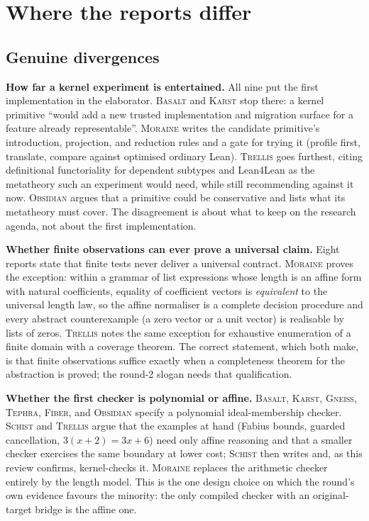 \documentclass[11pt,a4paper]{article}
\newcommand{\Bs}{\textsc{Basalt}}
\newcommand{\Fb}{\textsc{Fiber}}
\newcommand{\Gn}{\textsc{Gneiss}}
\newcommand{\Ks}{\textsc{Karst}}
\newcommand{\Mr}{\textsc{Moraine}}
\newcommand{\Ob}{\textsc{Obsidian}}
\newcommand{\Sc}{\textsc{Schist}}
\newcommand{\Tp}{\textsc{Tephra}}
\newcommand{\Tr}{\textsc{Trellis}}
\theoremstyle{definition}
\begin{document}
\section{Where the reports differ}\label{sec:divergence}

\subsection{Genuine divergences}
\textbf{How far a kernel experiment is entertained.} All nine put the first implementation in the elaborator. \Bs{} and \Ks{} stop there: a kernel primitive ``would add a new trusted implementation and migration surface for a feature already representable''. \Mr{} writes the candidate primitive's introduction, projection, and reduction rules and a gate for trying it (profile first, translate, compare against optimised ordinary Lean). \Tr{} goes furthest, citing definitional functoriality for dependent subtypes and Lean4Lean as the metatheory such an experiment would need, while still recommending against it now. \Ob{} argues that a primitive could be conservative and lists what its metatheory must cover. The disagreement is about what to keep on the research agenda, not about the first implementation.

\textbf{Whether finite observations can ever prove a universal claim.} Eight reports state that finite tests never deliver a universal contract. \Mr{} proves the exception: within a grammar of list expressions whose length is an affine form with natural coefficients, equality of coefficient vectors is \emph{equivalent} to the universal length law, so the affine normaliser is a complete decision procedure and every abstract counterexample (a zero vector or a unit vector) is realisable by lists of zeros. \Tr{} notes the same exception for exhaustive enumeration of a finite domain with a coverage theorem. The correct statement, which both make, is that finite observations suffice exactly when a completeness theorem for the abstraction is proved; the round-2 slogan needs that qualification.

\textbf{Whether the first checker is polynomial or affine.} \Bs, \Ks, \Gn, \Tp, \Fb, and \Ob{} specify a polynomial ideal-membership checker. \Sc{} and \Tr{} argue that the examples at hand (Fabius bounds, guarded cancellation, $3(x+2)=3x+6$) need only affine reasoning and that a smaller checker exercises the same boundary at lower cost; \Sc{} then writes and, as this review confirms, kernel-checks it. \Mr{} replaces the arithmetic checker entirely by the length model. This is the one design choice on which the round's own evidence favours the minority: the only compiled checker with an original-target bridge is the affine one.
\end{document}

